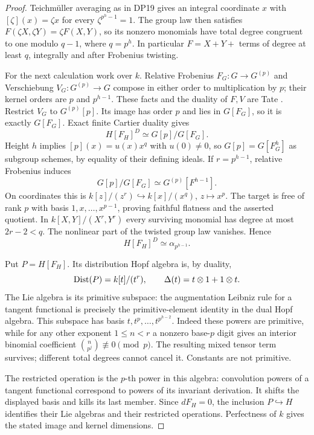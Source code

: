 \documentclass[11pt,a4paper]{article}
\theoremstyle{definition}\newtheorem{remark}[theorem]{Remark}
\begin{document}
\begin{proof}
Teichm\"uller averaging as in DP19 gives an integral coordinate $x$ with $[\zeta](x)=\zeta x$ for every $\zeta^{p^h-1}=1$. The group law then satisfies $F(\zeta X,\zeta Y)=\zeta F(X,Y)$, so its nonzero monomials have total degree congruent to one modulo $q-1$, where $q=p^h$. In particular $F=X+Y+$ terms of degree at least $q$, integrally and after Frobenius twisting.

For the next calculation work over $k$. Relative Frobenius $F_G:G\to G^{(p)}$ and Verschiebung $V_G:G^{(p)}\to G$ compose in either order to multiplication by $p$; their kernel orders are $p$ and $p^{h-1}$. These facts and the duality of $F,V$ are Tate \cite[\S2.2, diagram (3), pp.~163--164; \S2.3, Proposition 3, p.~166]{Tate67}. Restrict $V_G$ to $G^{(p)}[p]$. Its image has order $p$ and lies in $G[F_G]$, so it is exactly $G[F_G]$. Exact finite Cartier duality \cite[\S1.2--1.3, pp.~159--160]{Tate67} gives
\[
 H[F_H]^D\simeq G[p]/G[F_G].
\]
Height $h$ implies $[p](x)=u(x)x^q$ with $u(0)\ne0$, so $G[p]=G[F_G^h]$ as subgroup schemes, by equality of their defining ideals. If $r=p^{h-1}$, relative Frobenius induces
\[
 G[p]/G[F_G]\simeq G^{(p)}[F^{h-1}].
\]
On coordinates this is $k[z]/(z^r)\hookrightarrow k[x]/(x^q)$, $z\mapsto x^p$. The target is free of rank $p$ with basis $1,x,\ldots,x^{p-1}$, proving faithful flatness and the asserted quotient. In $k[X,Y]/(X^r,Y^r)$ every surviving monomial has degree at most $2r-2<q$. The nonlinear part of the twisted group law vanishes. Hence
\begin{equation}\label{eq:dual-F-kernel}
 H[F_H]^D\simeq\alpha_{p^{h-1}}.
\end{equation}

Put $P=H[F_H]$. Its distribution Hopf algebra is, by duality,
\[
 \operatorname{Dist}(P)=k[t]/(t^r),\qquad\Delta(t)=t\otimes1+1\otimes t.
\]
The Lie algebra is its primitive subspace: the augmentation Leibniz rule for a tangent functional is precisely the primitive-element identity in the dual Hopf algebra. This subspace has basis $t,t^p,\ldots,t^{p^{h-2}}$. Indeed these powers are primitive, while for any other exponent $1\le n<r$ a nonzero base-$p$ digit gives an interior binomial coefficient $\binom n{p^j}\not\equiv0\pmod p$. The resulting mixed tensor term survives; different total degrees cannot cancel it. Constants are not primitive.

The restricted operation is the $p$-th power in this algebra: convolution powers of a tangent functional correspond to powers of its invariant derivation. It shifts the displayed basis and kills its last member. Since $dF_H=0$, the inclusion $P\hookrightarrow H$ identifies their Lie algebras and their restricted operations. Perfectness of $k$ gives the stated image and kernel dimensions.


\end{proof}
\end{document}
